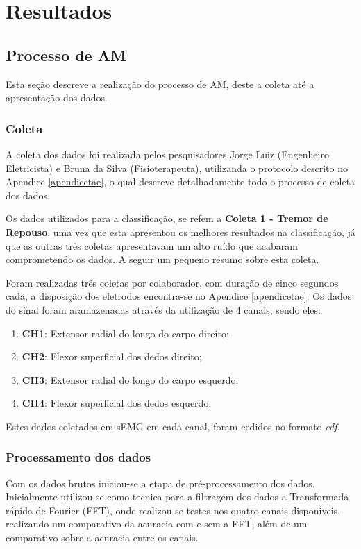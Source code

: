 \chapter{Resultados}
\label{ch:Resultados}
\section{Processo de AM}
Esta seção descreve a realização do processo de AM, deste a coleta até a apresentação dos dados.
\subsection{Coleta}
A coleta dos dados foi realizada pelos pesquisadores Jorge Luiz (Engenheiro Eletricista) e Bruna da Silva (Fisioterapeuta), utilizanda o protocolo descrito no Apendice \ref{apendicetae}, o qual descreve detalhadamente todo o processo de coleta dos dados.

Os dados utilizados para a classificação, se refem a \textbf{Coleta 1 - Tremor de Repouso}, uma vez que esta apresentou os melhores resultados na classificação, já que as outras três coletas apresentavam um alto ruído que acabaram comprometendo os dados. A seguir um pequeno resumo sobre esta coleta.

Foram realizadas três coletas por colaborador, com duração de cinco segundos cada, a disposição dos eletrodos encontra-se no Apendice \ref{apendicetae}. Os dados do sinal foram aramazenadas através da utilização de 4 canais, sendo eles:
\begin{enumerate}
    \item \textbf{CH1}: Extensor radial do longo do carpo direito;
    \item \textbf{CH2}: Flexor superficial dos dedos direito;
    \item \textbf{CH3}: Extensor radial do longo do carpo esquerdo;
    \item \textbf{CH4}: Flexor superficial dos dedos esquerdo.
\end{enumerate}

Estes dados coletados em sEMG em cada canal, foram cedidos no formato \textit{edf}.

\subsection{Processamento dos dados}
Com os dados brutos iniciou-se a etapa de pré-processamento dos dados. Inicialmente utilizou-se como tecnica para a filtragem dos dados a Transformada rápida de Fourier (FFT), onde realizou-se testes nos quatro canais disponiveis, realizando um comparativo da acuracia com e sem a FFT, além de um comparativo sobre a acuracia entre os canais. 

